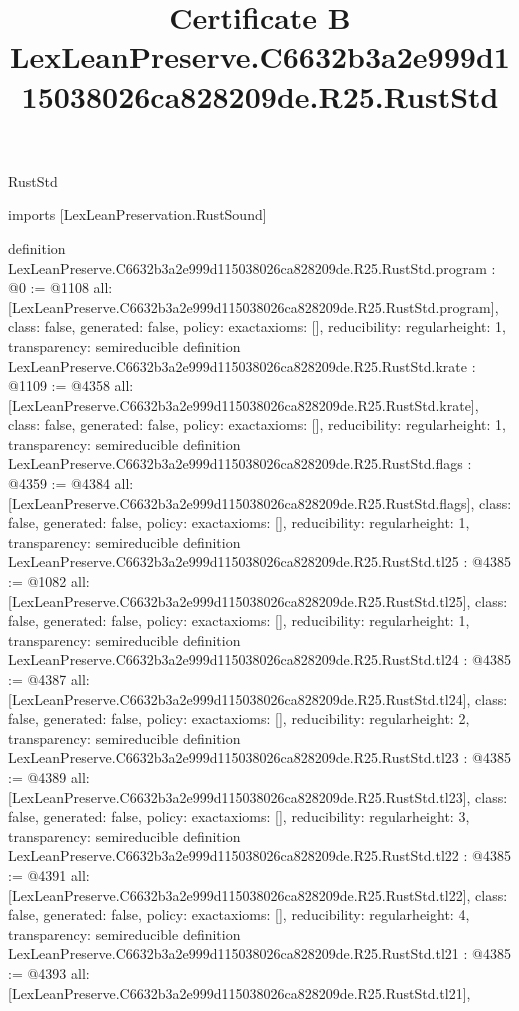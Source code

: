 \begin{lexlean}{RustStd}
\title{Certificate B LexLeanPreserve.C6632b3a2e999d115038026ca828209de.R25.RustStd}
\begin{coremodule}
imports [LexLeanPreservation.RustSound]

definition LexLeanPreserve.C6632b3a2e999d115038026ca828209de.R25.RustStd.program : @0 := @1108 {
  all: [LexLeanPreserve.C6632b3a2e999d115038026ca828209de.R25.RustStd.program],
  class: false,
  generated: false,
  policy: exact{axioms: []},
  reducibility: regular{height: 1},
  transparency: semireducible
}
definition LexLeanPreserve.C6632b3a2e999d115038026ca828209de.R25.RustStd.krate : @1109 := @4358 {
  all: [LexLeanPreserve.C6632b3a2e999d115038026ca828209de.R25.RustStd.krate],
  class: false,
  generated: false,
  policy: exact{axioms: []},
  reducibility: regular{height: 1},
  transparency: semireducible
}
definition LexLeanPreserve.C6632b3a2e999d115038026ca828209de.R25.RustStd.flags : @4359 := @4384 {
  all: [LexLeanPreserve.C6632b3a2e999d115038026ca828209de.R25.RustStd.flags],
  class: false,
  generated: false,
  policy: exact{axioms: []},
  reducibility: regular{height: 1},
  transparency: semireducible
}
definition LexLeanPreserve.C6632b3a2e999d115038026ca828209de.R25.RustStd.tl25 : @4385 := @1082 {
  all: [LexLeanPreserve.C6632b3a2e999d115038026ca828209de.R25.RustStd.tl25],
  class: false,
  generated: false,
  policy: exact{axioms: []},
  reducibility: regular{height: 1},
  transparency: semireducible
}
definition LexLeanPreserve.C6632b3a2e999d115038026ca828209de.R25.RustStd.tl24 : @4385 := @4387 {
  all: [LexLeanPreserve.C6632b3a2e999d115038026ca828209de.R25.RustStd.tl24],
  class: false,
  generated: false,
  policy: exact{axioms: []},
  reducibility: regular{height: 2},
  transparency: semireducible
}
definition LexLeanPreserve.C6632b3a2e999d115038026ca828209de.R25.RustStd.tl23 : @4385 := @4389 {
  all: [LexLeanPreserve.C6632b3a2e999d115038026ca828209de.R25.RustStd.tl23],
  class: false,
  generated: false,
  policy: exact{axioms: []},
  reducibility: regular{height: 3},
  transparency: semireducible
}
definition LexLeanPreserve.C6632b3a2e999d115038026ca828209de.R25.RustStd.tl22 : @4385 := @4391 {
  all: [LexLeanPreserve.C6632b3a2e999d115038026ca828209de.R25.RustStd.tl22],
  class: false,
  generated: false,
  policy: exact{axioms: []},
  reducibility: regular{height: 4},
  transparency: semireducible
}
definition LexLeanPreserve.C6632b3a2e999d115038026ca828209de.R25.RustStd.tl21 : @4385 := @4393 {
  all: [LexLeanPreserve.C6632b3a2e999d115038026ca828209de.R25.RustStd.tl21],
}
\end{coremodule}
\end{lexlean}
